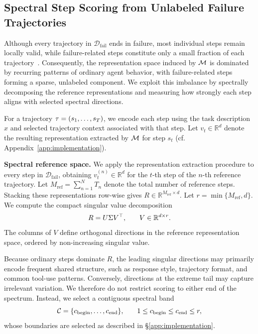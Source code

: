 \subsection{Spectral Step Scoring from Unlabeled Failure Trajectories}
\label{sec:method:base}


Although every trajectory in $\mathcal{D}_{\mathrm{fail}}$ ends in failure,
most individual steps remain locally valid, while failure-related steps
constitute only a small fraction of each trajectory~\citep{whoandwhen}.
Consequently, the representation space induced by $\mathcal{M}$ is dominated by
recurring patterns of ordinary agent behavior, with failure-related steps
forming a sparse, unlabeled component.
We exploit this imbalance by spectrally decomposing the  reference
representations and measuring how strongly each step aligns with selected
spectral directions.


For a trajectory $\tau=(s_1,\ldots,s_T)$, we encode each step using the task
description $x$ and selected trajectory context associated with that step.
Let
$
    v_t\in\mathbb{R}^{d}
$
denote the resulting representation extracted by $\mathcal{M}$ for step $s_t$ (cf. Appendix~\ref{app:implementation}).



\textbf{Spectral reference space.}
We apply the representation extraction procedure to every step in
$\mathcal{D}_{\mathrm{fail}}$, obtaining
$v_t^{(n)}\in\mathbb{R}^{d}$ for the $t$-th step of the $n$-th reference
trajectory.
Let
$
    M_{\mathrm{ref}}
    =
    \sum_{n=1}^{N}T_n
$
denote the total number of reference steps.
Stacking these representations row-wise gives
$R\in\mathbb{R}^{M_{\mathrm{ref}}\times d}$.
Let $r=\min\{M_{\mathrm{ref}},d\}$.
We compute the compact singular value decomposition
\begin{equation}
\small
    R
    =
    U\Sigma V^\top,
    \qquad
    V\in\mathbb{R}^{d\times r}.
    \label{eq:reference-svd}
\end{equation}
The columns of $V$ define orthogonal directions in the reference
representation space, ordered by non-increasing singular value.


Because ordinary steps dominate $R$, the leading singular directions may
primarily encode frequent shared structure, such as response style,
trajectory format, and common tool-use patterns.
Conversely, directions at the extreme tail may capture irrelevant
variation.
We therefore do not restrict scoring to either end of the spectrum.
Instead, we select a contiguous spectral band
\begin{equation}
\small
    \mathcal{C}
    =
    \{c_{\mathrm{begin}},\ldots,c_{\mathrm{end}}\},
    \qquad
    1
    \leq
    c_{\mathrm{begin}}
    \leq
    c_{\mathrm{end}}
    \leq
    r,
    \label{eq:spectral-band}
\end{equation}
whose boundaries are selected as described in
\S\ref{app:implementation}.


